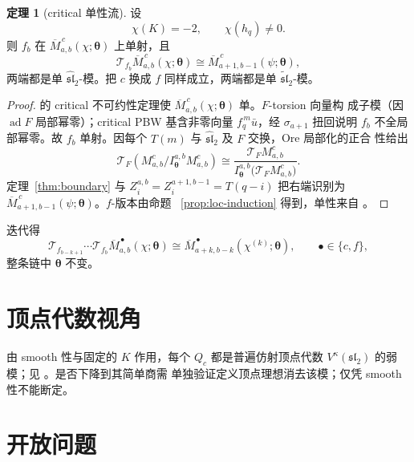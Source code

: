 \documentclass[UTF8,11pt]{ctexart}
\newcommand{\slc}{\mathfrak{sl}_2}
\newcommand{\slh}{\widehat{\mathfrak{sl}}_2}
\newcommand{\slt}{\widetilde{\mathfrak{sl}}_2}
\newcommand{\ad}{\operatorname{ad}}
\newcommand{\T}{\mathcal T}
\theoremstyle{definition}
\newtheorem{theorem}[proposition]{定理}
\begin{document}
\begin{theorem}[critical 单性流]\label{thm:critical-flow}
设
\[
\chi(K)=-2,\qquad \chi(h_q)\ne0.
\]
则 \(f_b\) 在 \(\overline M^{\,c}_{a,b}(\chi;\boldsymbol\theta)\) 上单射，且
\[
\boxed{\ \T_{f_b}\overline M^{\,c}_{a,b}(\chi;\boldsymbol\theta)
\cong \overline M^{\,c}_{a+1,b-1}(\psi;\boldsymbol\theta),\ }
\]
两端都是单 \(\slh\)-模。把 \(c\) 换成 \(f\) 同样成立，两端都是单
\(\slt\)-模。
\end{theorem}

\begin{proof}
\cite{FGXZ} 的 critical 不可约性定理使
\(\overline M^{\,c}_{a,b}(\chi;\boldsymbol\theta)\) 单。\(F\)-torsion 向量构
成子模（因 \(\ad F\) 局部幂零）；critical PBW 基含非零向量
\(f_q^{\,m}\bar u\)，经 \(\sigma_{a+1}\) 扭回说明 \(f_b\) 不全局部幂零。故
\(f_b\) 单射。因每个 \(T(m)\) 与 \(\slh\) 及 \(F\) 交换，Ore 局部化的正合
性给出
\[
\T_F\!\left(M^c_{a,b}/I^{a,b}_{\boldsymbol\theta}M^c_{a,b}\right)
\cong
\frac{\T_FM^c_{a,b}}{I^{a,b}_{\boldsymbol\theta}\bigl(\T_FM^c_{a,b}\bigr)}.
\]
定理~\ref{thm:boundary} 与 \(Z_i^{a,b}=Z_i^{a+1,b-1}=T(q-i)\) 把右端识别为
\(\overline M^{\,c}_{a+1,b-1}(\psi;\boldsymbol\theta)\)。\(f\)-版本由命题
~\ref{prop:loc-induction} 得到，单性来自 \cite[定理 4.2]{FGXZ}。
\end{proof}

迭代得
\[
\T_{f_{b-k+1}}\cdots\T_{f_b}
\overline M^{\,\bullet}_{a,b}(\chi;\boldsymbol\theta)
\cong
\overline M^{\,\bullet}_{a+k,b-k}(\chi^{(k)};\boldsymbol\theta),
\qquad \bullet\in\{c,f\},
\]
整条链中 \(\boldsymbol\theta\) 不变。

\section{顶点代数视角}\label{sec:vertex}

由 smooth 性与固定的 \(K\) 作用，每个 \(Q_c\) 都是普遍仿射顶点代数
\(V^\kappa(\slc)\) 的弱模；见 \cite[Section 2]{FGXZ}。是否下降到其简单商需
单独验证定义顶点理想消去该模；仅凭 smooth 性不能断定。

\section{开放问题}\label{sec:open}
\end{document}
